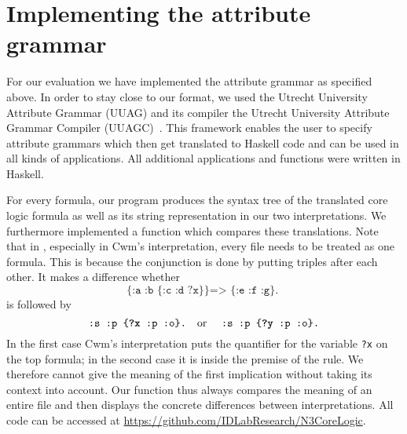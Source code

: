 \section{Implementing the attribute grammar}\label{imp}
For our evaluation we have implemented the attribute grammar as specified above. 
In order to stay close to our format, we used the Utrecht University Attribute Grammar (UUAG) and its compiler 
the Utrecht University Attribute Grammar Compiler (UUAGC)~\cite{uuag}. This framework enables the user to specify attribute grammars which 
then get translated to Haskell code and can be used in all kinds of applications. All additional applications and functions were written in Haskell.
%
% 


For every \nthree formula, our program produces the syntax tree of the translated core logic formula as well as its string representation in our two 
interpretations.
We furthermore implemented a function which compares these translations. Note that in \nthree, 
especially in Cwm's interpretation, every file needs to be treated as one formula. This is because the conjunction is done by
putting triples after each other. It makes a difference whether 
\[
 \texttt{\{:a :b \{:c :d ?x\}\} => \{:e :f :g\}. }
\]
is followed by
\[
  \texttt{:s :p \{\textbf{?x} :p :o\}.} \text{\quad or \quad}  \texttt{:s :p \{\textbf{?y} :p :o\}.}
\]
In the first case Cwm's interpretation puts the quantifier for the variable \texttt{?x} on the top formula; in the second case it is inside the premise of the rule.
We therefore cannot give the meaning of the first implication without taking its context into account. Our function thus always 
compares the meaning of an entire file and then displays the concrete differences between interpretations. All code can be accessed at \url{https://github.com/IDLabResearch/N3CoreLogic}.



